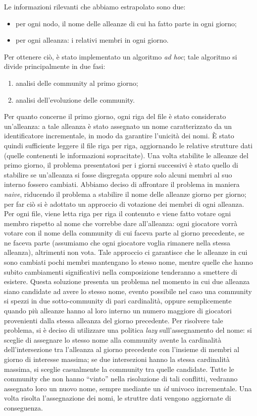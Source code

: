 Le informazioni rilevanti che abbiamo estrapolato sono due:
\begin{itemize}
	\item per ogni nodo, il nome delle alleanze di cui ha fatto parte in ogni giorno;
	\item per ogni alleanza: i relativi membri in ogni giorno. 
\end{itemize}
Per ottenere ciò, è stato implementato un algoritmo \textit{ad hoc}; tale algoritmo si divide principalmente in due fasi:
\begin{enumerate}
	\item analisi delle community al primo giorno;
	\item analisi dell'evoluzione delle community.
\end{enumerate}
Per quanto concerne il primo giorno, ogni riga del file è stato considerato un'alleanza: a tale alleanza è stato assegnato un nome caratterizzato da un identificatore incrementale, in modo da garantire l'unicità dei nomi. 
È stato quindi sufficiente leggere il file riga per riga, aggiornando le relative strutture dati (quelle contenenti le informazioni sopracitate).
Una volta stabilite le alleanze del primo giorno, il problema presentatosi per i giorni successivi è stato quello di stabilire se un'alleanza si fosse disgregata oppure solo alcuni membri al suo interno fossero cambiati.
Abbiamo deciso di affrontare il problema in maniera \textit{naive}, riducendo il problema a stabilire il nome delle alleanze giorno per giorno; per far ciò si è adottato un approccio di votazione dei membri di ogni alleanza.
Per ogni file, viene letta riga per riga il contenuto e viene fatto votare ogni membro rispetto al nome che vorrebbe dare all'alleanza: ogni giocatore vorrà votare con il nome della community di cui faceva parte al giorno precedente, se ne faceva parte (assumiamo che ogni giocatore voglia rimanere nella stessa alleanza), altrimenti non vota.
Tale approccio ci garantisce che le alleanze in cui sono cambiati pochi membri mantengano lo stesso nome, mentre quelle che hanno subito cambiamenti significativi nella composizione tenderanno a smettere di esistere.
Questa soluzione presenta un problema nel momento in cui due alleanza siano candidate ad avere lo stesso nome, evento possibile nel caso una community si spezzi in due sotto-community di pari cardinalità, oppure semplicemente quando più alleanze hanno al loro interno un numero maggiore di giocatori provenienti dalla stessa alleanza del giorno precedente.
Per risolvere tale problema, si è deciso di utilizzare una politica \textit{lazy} sull'assegnamento del nome: si sceglie di assegnare lo stesso nome alla community avente la cardinalità dell'intersezione tra l'alleanza al giorno precedente con l'insieme di membri al giorno di interesse massima; se due intersezioni hanno la stessa cardinalità massima, si sceglie casualmente la community tra quelle candidate.
Tutte le community che non hanno “vinto” nella risoluzione di tali conflitti, vedranno assegnato loro un nuovo nome, sempre mediante un \textit{id} univoco incrementale.
Una volta risolta l'assegnazione dei nomi, le struttre dati vengono aggiornate di conseguenza.

